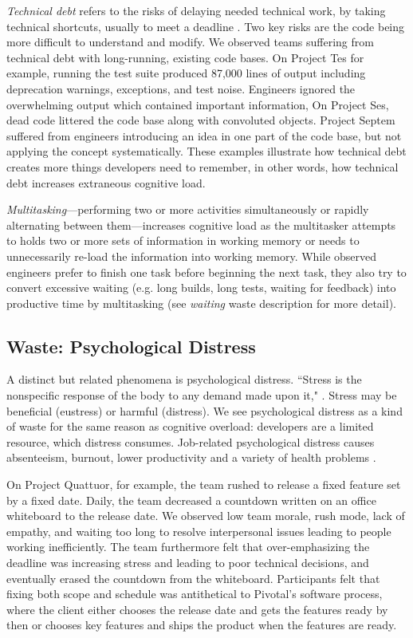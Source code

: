 \textit{Technical debt} refers to the risks of delaying needed technical work, by taking technical shortcuts, usually to meet a deadline \cite{McConnellTechnicalDebt}. Two key risks are the code being more difficult to understand and modify. We observed teams suffering from technical debt with long-running, existing code bases. On Project Tes for example, running the test suite produced 87,000 lines of output including deprecation warnings, exceptions, and test noise. Engineers ignored the overwhelming output which contained important information, On Project Ses, dead code littered the code base along with convoluted objects. Project Septem suffered from engineers introducing an idea in one part of the code base, but not applying the concept systematically. These examples illustrate how technical debt creates more things developers need to remember, in other words, how technical debt increases extraneous cognitive load. 

\textit{Multitasking}---performing two or more activities simultaneously or rapidly alternating between them---increases cognitive load as the multitasker attempts to holds two or more sets of information in working memory or needs to unnecessarily re-load  the information into working memory. While observed engineers prefer to finish one task before beginning the next task, they also try to convert excessive waiting (e.g. long builds, long tests, waiting for feedback) into productive time by multitasking (see \textit{waiting} waste description for more detail).

\subsection{Waste: Psychological Distress}
A distinct but related phenomena is psychological distress. “Stress is the nonspecific response of the body to any demand made upon it," \cite{Selye1976}. Stress may be beneficial (eustress) or harmful (distress). We see psychological distress as a kind of waste for the same reason as cognitive overload: developers are a limited resource, which distress consumes. Job-related psychological distress causes absenteeism, burnout, lower productivity and a variety of health problems \cite{Westman2001}.   
 
On Project Quattuor, for example, the team rushed to release a fixed feature set by a fixed date. Daily, the team decreased a countdown written on an office whiteboard to the release date. We observed low team morale, rush mode, lack of empathy, and waiting too long to resolve interpersonal issues leading to people working inefficiently. The team furthermore felt that over-emphasizing the deadline was increasing stress and leading to poor technical decisions, and eventually erased the countdown from the whiteboard. Participants felt that fixing both scope and schedule was antithetical to Pivotal's software process, where the client either chooses the release date and gets the features ready by then or chooses key features and ships the product when the features are ready. 


